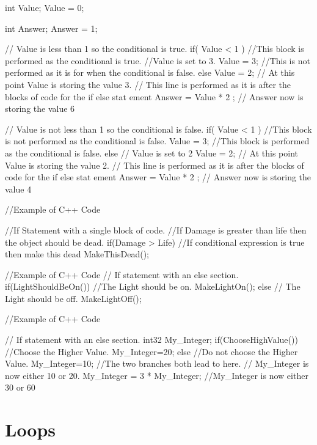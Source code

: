 \begin{DoxyItemize}
\begin{DoxyCode}
 int Value;
 Value = 0;

 int Answer;
 Answer = 1;

 // Value is less than 1 so the conditional is true.
 if( Value < 1 )
 //This block is performed as the conditional is true.
 {
 //Value is set to 3.
  Value = 3;
 }
 //This is not performed as it is for when the conditional is false.
 else
 {
  Value = 2;
 }
 // At this point Value is storing the value 3.
 // This line is performed as it is after the blocks of code for the if else stat
      ement
 Answer = Value * 2 ;
 // Answer now is storing the value 6

 // Value is not less than 1 so the conditional is false.
 if( Value < 1 )
 //This block is not performed as the conditional is false.
 {
  Value = 3;
 }
 //This block is performed as the conditional is false.
 else
 {
 // Value is set to 2
  Value = 2;
 }
 // At this point Value is storing the value 2.
 // This line is performed as it is after the blocks of code for the if else stat
      ement
 Answer = Value * 2 ;
 // Answer now is storing the value 4
\end{DoxyCode}
 
\begin{DoxyCode}
 //Example of C++ Code

 //If Statement with a single block of code.
 //If Damage is greater than life then the object should be dead.
 if(Damage > Life)
 {
  //If conditional expression is true then make this dead
  MakeThisDead();
 }
\end{DoxyCode}
 
\begin{DoxyCode}
 //Example of C++ Code
 // If statement with an else section.
 if(LightShouldBeOn())
 {
 //The Light should be on.
   MakeLightOn();
 }
 else
 {
 // The Light should be off.
   MakeLightOff();
 }
\end{DoxyCode}
 
\begin{DoxyCode}
 //Example of C++ Code

 // If statement with an else section.
 int32 My_Integer;
 if(ChooseHighValue())
 {
 //Choose the Higher Value.
   My_Integer=20;
 }
 else
 {
 //Do not choose the Higher Value.
   My_Integer=10;
 }
 //The two branches both lead to here.
 // My_Integer is now either 10 or 20.
 My_Integer = 3 * My_Integer;
 //My_Integer is now either 30 or 60
\end{DoxyCode}

\end{DoxyItemize}\hypertarget{_programming_basics_BasicsPageLoops}{}\section{Loops}\label{_programming_basics_BasicsPageLoops}
